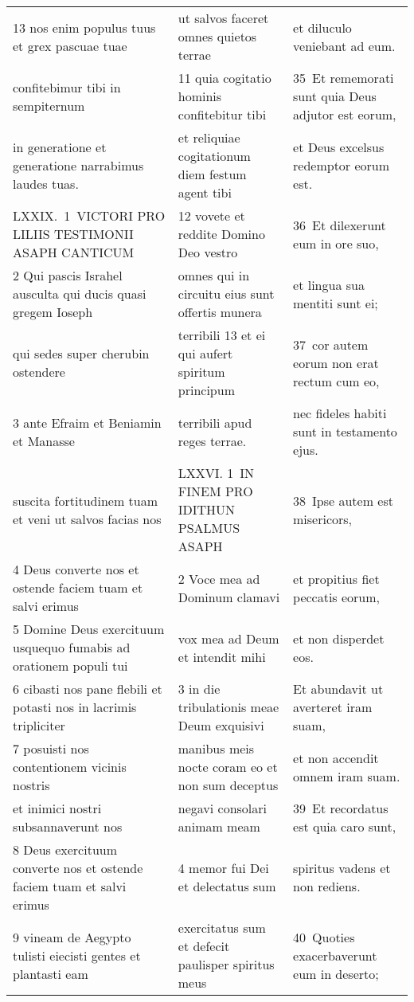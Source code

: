 \documentclass{article}
\begin{document}
\begin{longtable}{@{}p{}p{}p{}@{}}
13 nos enim populus tuus et grex pascuae tuae	&	ut salvos faceret omnes quietos terrae	&	et diluculo veniebant ad eum.	\\
confitebimur tibi in sempiternum	&	11 quia cogitatio hominis confitebitur tibi	&	35 Et rememorati sunt quia Deus adjutor est eorum,	\\
in generatione et generatione narrabimus laudes tuas.	&	et reliquiae cogitationum diem festum agent tibi	&	et Deus excelsus redemptor eorum est.	\\
LXXIX. 1 VICTORI PRO LILIIS TESTIMONII ASAPH CANTICUM	&	12 vovete et reddite Domino Deo vestro	&	36 Et dilexerunt eum in ore suo,	\\
2 Qui pascis Israhel ausculta qui ducis quasi gregem Ioseph	&	omnes qui in circuitu eius sunt offertis munera	&	et lingua sua mentiti sunt ei;	\\
qui sedes super cherubin ostendere	&	terribili 13 et ei qui aufert spiritum principum	&	37 cor autem eorum non erat rectum cum eo,	\\
3 ante Efraim et Beniamin et Manasse	&	terribili apud reges terrae.	&	nec fideles habiti sunt in testamento ejus.	\\
suscita fortitudinem tuam et veni ut salvos facias nos	&	LXXVI. 1 IN FINEM PRO IDITHUN PSALMUS ASAPH	&	38 Ipse autem est misericors,	\\
4 Deus converte nos et ostende faciem tuam et salvi erimus	&	2 Voce mea ad Dominum clamavi	&	et propitius fiet peccatis eorum,	\\
5 Domine Deus exercituum usquequo fumabis ad orationem populi tui	&	vox mea ad Deum et intendit mihi	&	et non disperdet eos.	\\
6 cibasti nos pane flebili et potasti nos in lacrimis tripliciter	&	3 in die tribulationis meae Deum exquisivi	&	Et abundavit ut averteret iram suam,	\\
7 posuisti nos contentionem vicinis nostris	&	manibus meis nocte coram eo et non sum deceptus	&	et non accendit omnem iram suam.	\\
et inimici nostri subsannaverunt nos	&	negavi consolari animam meam	&	39 Et recordatus est quia caro sunt,	\\
8 Deus exercituum converte nos et ostende faciem tuam et salvi erimus	&	4 memor fui Dei et delectatus sum	&	spiritus vadens et non rediens.	\\
9 vineam de Aegypto tulisti eiecisti gentes et plantasti eam	&	exercitatus sum et defecit paulisper spiritus meus	&	40 Quoties exacerbaverunt eum in deserto;	\\

\end{longtable}
\end{document}
